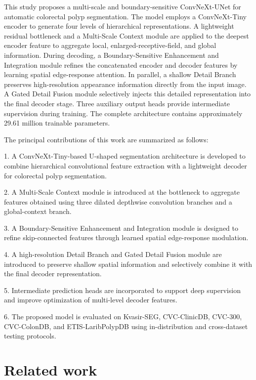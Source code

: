 This study proposes a multi-scale and boundary-sensitive ConvNeXt-UNet
for automatic colorectal polyp segmentation. The model employs a
ConvNeXt-Tiny encoder to generate four levels of hierarchical
representations. A lightweight residual bottleneck and a Multi-Scale
Context module are applied to the deepest encoder feature to aggregate
local, enlarged-receptive-field, and global information. During
decoding, a Boundary-Sensitive Enhancement and Integration module
refines the concatenated encoder and decoder features by learning
spatial edge-response attention. In parallel, a shallow Detail Branch
preserves high-resolution appearance information directly from the input
image. A Gated Detail Fusion module selectively injects this detailed
representation into the final decoder stage. Three auxiliary output
heads provide intermediate supervision during training. The complete
architecture contains approximately 29.61 million trainable parameters.

The principal contributions of this work are summarized as follows:

1. A ConvNeXt-Tiny-based U-shaped segmentation architecture is developed
to combine hierarchical convolutional feature extraction with a
lightweight decoder for colorectal polyp segmentation.

2. A Multi-Scale Context module is introduced at the bottleneck to
aggregate features obtained using three dilated depthwise convolution
branches and a global-context branch.

3. A Boundary-Sensitive Enhancement and Integration module is designed
to refine skip-connected features through learned spatial edge-response
modulation.

4. A high-resolution Detail Branch and Gated Detail Fusion module are
introduced to preserve shallow spatial information and selectively
combine it with the final decoder representation.

5. Intermediate prediction heads are incorporated to support deep
supervision and improve optimization of multi-level decoder features.

6. The proposed model is evaluated on Kvasir-SEG, CVC-ClinicDB, CVC-300,
CVC-ColonDB, and ETIS-LaribPolypDB using in-distribution and
cross-dataset testing protocols.

\section{Related work}\label{related-work}

